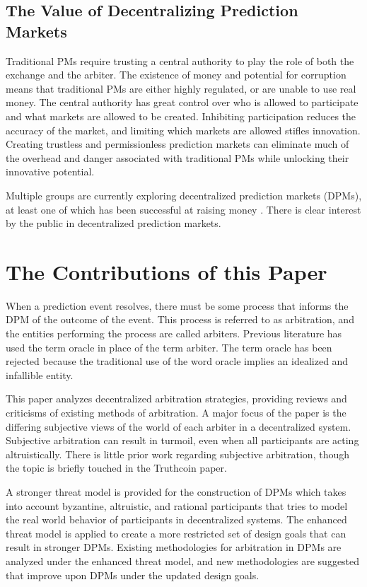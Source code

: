 \documentclass[onecolumn]{article}
\begin{document}
\subsection{The Value of Decentralizing Prediction Markets}
Traditional PMs require trusting a central authority to play the role of both the exchange and the arbiter.
The existence of money and potential for corruption means that traditional PMs are either highly regulated, or are unable to use real money.
The central authority has great control over who is allowed to participate and what markets are allowed to be created.
Inhibiting participation reduces the accuracy of the market, and limiting which markets are allowed stifles innovation.
Creating trustless and permissionless prediction markets can eliminate much of the overhead and danger associated with traditional PMs while unlocking their innovative potential.

Multiple groups are currently exploring decentralized prediction markets (DPMs), at least one of which has been successful at raising money \cite{augsale}.
There is clear interest by the public in decentralized prediction markets.

\section{The Contributions of this Paper}
When a prediction event resolves, there must be some process that informs the DPM of the outcome of the event.
This process is referred to as arbitration, and the entities performing the process are called arbiters.
Previous literature \cite{augur} \cite{truthcoin} has used the term oracle in place of the term arbiter.
The term oracle has been rejected because the traditional use of the word oracle implies an idealized and infallible entity.

This paper analyzes decentralized arbitration strategies, providing reviews and criticisms of existing methods of arbitration.
A major focus of the paper is the differing subjective views of the world of each arbiter in a decentralized system.
Subjective arbitration can result in turmoil, even when all participants are acting altruistically.
There is little prior work regarding subjective arbitration, though the topic is briefly touched in the Truthcoin \cite{truthcoin} paper.

A stronger threat model is provided for the construction of DPMs which takes into account byzantine, altruistic, and rational participants \cite{bar} that tries to model the real world behavior of participants in decentralized systems.
The enhanced threat model is applied to create a more restricted set of design goals that can result in stronger DPMs.
Existing methodologies for arbitration in DPMs are analyzed under the enhanced threat model, and new methodologies are suggested that improve upon DPMs under the updated design goals.
\end{document}
